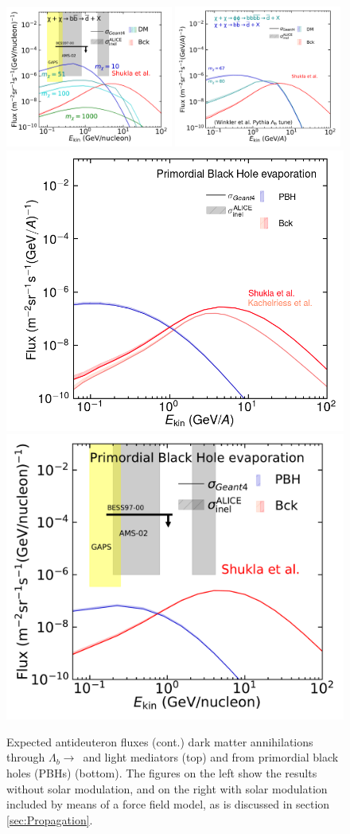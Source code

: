 \begin{figure}\ContinuedFloat
    \centering
    \includegraphics[width=0.49\textwidth]{figures/antideuteron_TOA_bb.pdf}
    \includegraphics[width=0.49\textwidth]{figures/antideuteron_lambdaB_LIS.pdf}
    \includegraphics[width=.49\textwidth]{figures/antideuteron_fluxes_PBH_LIS.png}
    \includegraphics[width=.49\textwidth]{figures/antideuteron_TOA_PBH.pdf}
    \caption{Expected antideuteron fluxes (cont.) dark matter annihilations through $\Lambda_b \rightarrow $\bb\ and light mediators (top) and from primordial black holes (PBHs) (bottom). The figures on the left show the results without solar modulation, and on the right with solar modulation included by means of a force field model, as is discussed in section \ref{sec:Propagation}.}
    \label{fig:Results_dbar_fluxes_diff_DM_masses}
\end{figure}


